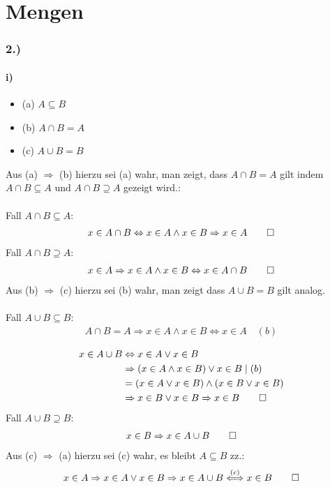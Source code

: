 \documentclass[titlepage]{article}
\begin{document}
	\part*{Mengen}
		\section*{2.)}
			\subsection*{i)}
				\begin{itemize}
					\item (a) $A\subseteq B$
					\item (b) $A\cap B=A$
					\item (c) $A\cup B=B$
				\end{itemize}
			Aus (a) $\Rightarrow$ (b) hierzu sei (a) wahr, man zeigt, dass $A\cap B= A$ gilt indem $A\cap B\subseteq A$ und $A\cap B\supseteq A$ gezeigt wird.:
			\\\\
			Fall $A\cap B\subseteq A$:
			\begin{align*}
				x\in A\cap B\Leftrightarrow x\in A\wedge x\in B\Rightarrow x\in A\qed
			\end{align*}
			Fall $A\cap B\supseteq A$:
			\begin{align*}
				x\in A\Rightarrow x\in A\wedge x\in B\Leftrightarrow x\in A\cap B\qed
			\end{align*}
			Aus (b) $\Rightarrow$ (c) hierzu sei (b) wahr, man zeigt dass $A\cup B=B$ gilt analog.
			\\\\
			Fall $A\cup B\subseteq B$:
			\begin{align*}
				A\cap B=A\Rightarrow x\in A\wedge x\in B\Leftrightarrow x\in A\quad(b)\\
			\end{align*}
			\begin{align*}
				x\in A\cup B&\Leftrightarrow x\in A\vee x\in B\\
				&\Rightarrow(x\in A\wedge x\in B)\vee x\in B\mid (b)\\
				&=(x\in A\vee x\in B)\wedge(x\in B\vee x\in B)\\
				&\Rightarrow x\in B\vee x\in B\Rightarrow x\in B\qed
			\end{align*}
			Fall $A\cup B\supseteq B$:
			\begin{align*}
				x\in B\Rightarrow x\in A\cup B\qed
			\end{align*}
			Aus (c) $\Rightarrow$ (a) hierzu sei (c) wahr, es bleibt $A\subseteq B$ zz.:
			\begin{align*}
				x\in A\Rightarrow x\in A\vee x\in B\Rightarrow x\in A\cup B\overset{(c)}{\Longleftrightarrow}x\in B\qed
			\end{align*}
\end{document}
